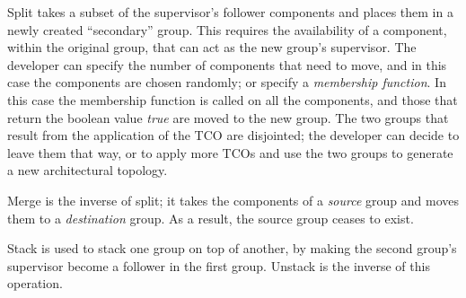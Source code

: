 Split takes a subset of the supervisor's follower components and places them in a newly created ``secondary'' group. This requires the availability of a component, within the original group, that can act as the new group's supervisor. The developer can specify the number of components that need to move, and in this case the components are chosen randomly; or specify a \emph{membership function}. In this case the membership function is called on all the components, and those that return the boolean value \emph{true} are moved to the new group. The two groups that result from the application of the TCO are disjointed; the developer can decide to leave them that way, or to apply more TCOs and use the two groups to generate a new architectural topology.

Merge is the inverse of split; it takes the components of a \emph{source} group and moves them to a \emph{destination} group. As a result, the source group ceases to exist.

Stack is used to stack one group on top of another, by making the second group's supervisor become a follower in the first group. Unstack is the inverse of this operation. 






